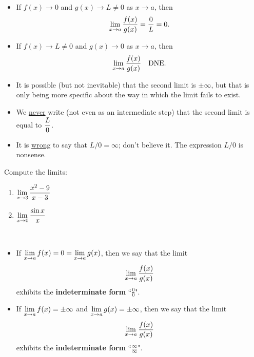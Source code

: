 

\begin{remark}\,
\begin{itemize}
\item If $f(x)\to 0$ and $g(x)\to L\ne 0$ as $x\to a$, then 
\begin{equation*}
\displaystyle\lim_{x\to a}\frac{f(x)}{g(x)} = \frac{0}{L} = 0.
\end{equation*}
\item If $f(x)\to L\ne 0$ and $g(x)\to 0$ as $x\to a$, then 
\begin{equation*}
\displaystyle\lim_{x\to a}\frac{f(x)}{g(x)} \quad \mathrm{DNE}.
\end{equation*}
\item It is possible (but not inevitable) that the second limit is $\pm\infty$, but that is only being more specific about the way in which the limit fails to exist.
\item We \underline{never} write (not even as an intermediate step) that the second limit is equal to $\displaystyle\frac{L}{0}$.
\item It is \underline{wrong} to say that $L/0 = \infty$; don't believe it.
The expression $L/0$ is nonsense.
\end{itemize}
\end{remark}

\begin{example}
Compute the limits:
\begin{enumerate}
\item $\displaystyle\lim_{x\to 3}\frac{x^2-9}{x-3}$
\vfill
\item $\displaystyle\lim_{x\to 0}\frac{\sin x}{x}$
\vfill
\end{enumerate}
\end{example}

\newpage

\begin{definition}\,
\begin{itemize}
\item If $\displaystyle\lim_{x\to a}f(x) =  0 = \lim_{x\to a}g(x)$, then we say that the limit $$\displaystyle\lim_{x\to a}\frac{f(x)}{g(x)}$$ exhibits  the \textbf{indeterminate form} ``$\frac{0}{0}$".
\item If $\displaystyle\lim_{x\to a}f(x) = \pm\infty$ and $\displaystyle\lim_{x\to a}g(x) = \pm\infty$, then we say that the limit $$\displaystyle\lim_{x\to a}\frac{f(x)}{g(x)}$$ exhibits  the \textbf{indeterminate form} ``$\frac{\infty}{\infty}$".
\end{itemize}
\end{definition}

